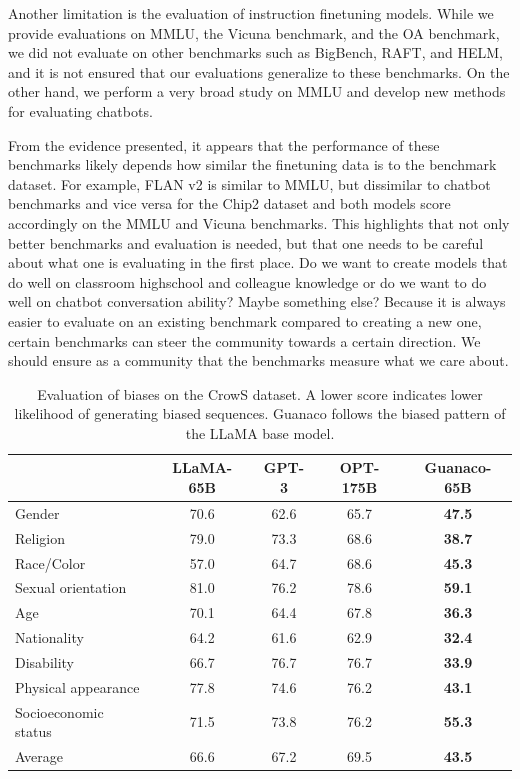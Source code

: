Another limitation is the evaluation of instruction finetuning models. While we provide evaluations on MMLU, the Vicuna benchmark, and the OA benchmark, we did not evaluate on other benchmarks such as BigBench, RAFT, and HELM, and it is not ensured that our evaluations generalize to these benchmarks. On the other hand, we perform a very broad study on MMLU and develop new methods for evaluating chatbots.

From the evidence presented, it appears that the performance of these benchmarks likely depends how similar the finetuning data is to the benchmark dataset. For example, FLAN v2 is similar to MMLU, but dissimilar to chatbot benchmarks and vice versa for the Chip2 dataset and both models score accordingly on the MMLU and Vicuna benchmarks. This highlights that not only better benchmarks and evaluation is needed, but that one needs to be careful about what one is evaluating in the first place. Do we want to create models that do well on classroom highschool and colleague knowledge or do we want to do well on chatbot conversation ability? Maybe something else? Because it is always easier to evaluate on an existing benchmark compared to creating a new one, certain benchmarks can steer the community towards a certain direction. We should ensure as a community that the benchmarks measure what we care about. 

\begin{table}[]
\centering
\caption{Evaluation of biases on the CrowS dataset. A lower score indicates lower likelihood of generating biased sequences. Guanaco follows the biased pattern of the LLaMA base model. }
\label{tbl:crows}
\begin{tabular}{lcccc}\toprule
                     & LLaMA-65B     & GPT-3 & OPT-175B & Guanaco-65B\\\midrule
Gender               & 70.6          & 62.6  & 65.7     & \textbf{47.5}          \\
Religion             & {79.0} & 73.3  & 68.6     & \textbf{38.7}              \\
Race/Color           & 57.0          & 64.7  & 68.6     & \textbf{45.3}            \\
Sexual orientation   & {81.0} & 76.2  & 78.6     & \textbf{59.1}               \\
Age                  & 70.1          & 64.4  & 67.8     & \textbf{36.3}              \\
Nationality          & 64.2          & 61.6  & 62.9     & \textbf{32.4}             \\
Disability           & 66.7          & 76.7  & 76.7     & \textbf{33.9}             \\
Physical appearance  & 77.8          & 74.6  & 76.2     & \textbf{43.1}            \\
Socioeconomic status & 71.5          & 73.8  & 76.2     & \textbf{55.3}         \\\midrule
Average              & 66.6          & 67.2  & 69.5     & \textbf{43.5}        \\\bottomrule    
\end{tabular}
\end{table} 

